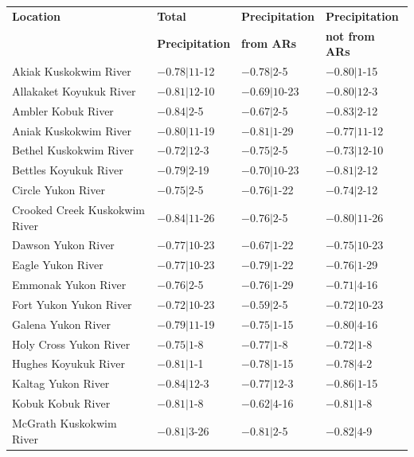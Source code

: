 \documentclass[12pts,draft]{AR_analysis_}
\begin{document}
\begin{table}[h]
    \begin{tabular}{llll}
    \toprule
    \textbf{Location} & \textbf{Total} & \textbf{Precipitation} & \textbf{Precipitation} \\
    \textbf{} & \textbf{Precipitation} & \textbf{from ARs} & \textbf{not from ARs} \\
    \midrule
	Akiak Kuskokwim River         &  $-0.78|11$-12 &  $-0.78|2$-5 &    $-0.80|1$-15 \\
	Allakaket Koyukuk River       &  $-0.81|12$-10 &  $-0.69|10$-23 &  $-0.80|12$-3 \\
	Ambler Kobuk River            &  $-0.84|2$-5 &    $-0.67|2$-5 &    $-0.83|2$-12 \\
	Aniak Kuskokwim River         &  $-0.80|11$-19 &  $-0.81|1$-29 &   $-0.77|11$-12 \\
	Bethel Kuskokwim River        &  $-0.72|12$-3 &   $-0.75|2$-5 &    $-0.73|12$-10 \\
	Bettles Koyukuk River         &  $-0.79|2$-19 &   $-0.70|10$-23 &  $-0.81|2$-12 \\
	Circle Yukon River            &  $-0.75|2$-5 &    $-0.76|1$-22 &   $-0.74|2$-12 \\
	Crooked Creek Kuskokwim River &  $-0.84|11$-26 &  $-0.76|2$-5 &    $-0.80|11$-26 \\
	Dawson Yukon River            &  $-0.77|10$-23 &  $-0.67|1$-22 &   $-0.75|10$-23 \\
	Eagle Yukon River             &  $-0.77|10$-23 &  $-0.79|1$-22 &   $-0.76|1$-29 \\
	Emmonak Yukon River           &  $-0.76|2$-5 &    $-0.76|1$-29 &   $-0.71|4$-16 \\
	Fort Yukon Yukon River        &  $-0.72|10$-23 &  $-0.59|2$-5 &    $-0.72|10$-23 \\
	Galena Yukon River            &  $-0.79|11$-19 &  $-0.75|1$-15 &   $-0.80|4$-16 \\
	Holy Cross Yukon River        &  $-0.75|1$-8 &    $-0.77|1$-8 &    $-0.72|1$-8 \\
	Hughes Koyukuk River          &  $-0.81|1$-1 &    $-0.78|1$-15 &   $-0.78|4$-2 \\
	Kaltag Yukon River            &  $-0.84|12$-3 &   $-0.77|12$-3 &   $-0.86|1$-15 \\
	Kobuk Kobuk River             &  $-0.81|1$-8 &    $-0.62|4$-16 &   $-0.81|1$-8 \\
	McGrath Kuskokwim River       &  $-0.81|3$-26 &   $-0.81|2$-5 &    $-0.82|4$-9 \\

\end{tabular}
\end{table}
\end{document}
